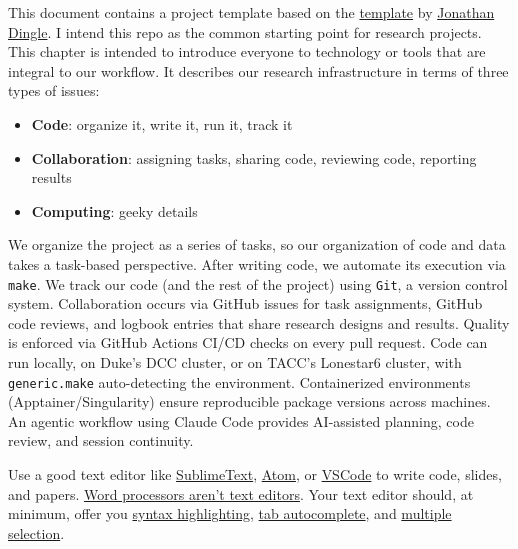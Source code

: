 This document contains a project template based on 
the \href{https://github.com/jrm87/projecttemplate}{template} by \href{http://www.jdingel.com/}{Jonathan Dingle}. 
I intend this repo as the common starting point for research projects. This chapter is intended to introduce everyone to technology or tools that are integral to our workflow.
It describes our research infrastructure in terms of three types of issues:
\begin{itemize}
\item \textbf{Code}: organize it, write it, run it, track it
\item \textbf{Collaboration}: assigning tasks, sharing code, reviewing code, reporting results
\item \textbf{Computing}: geeky details
\end{itemize}

We organize the project as a series of tasks, so our organization of code and data takes a task-based perspective.
After writing code, we automate its execution via \texttt{make}.
We track our code (and the rest of the project) using \texttt{Git}, a version control system.
Collaboration occurs via GitHub issues for task assignments, GitHub code reviews, and logbook entries that share research designs and results.
Quality is enforced via GitHub Actions CI/CD checks on every pull request.
Code can run locally, on Duke's DCC cluster, or on TACC's Lonestar6 cluster,
with \texttt{generic.make} auto-detecting the environment.
Containerized environments (Apptainer/Singularity) ensure reproducible package versions across machines.
An agentic workflow using Claude Code provides AI-assisted planning, code review, and session continuity.

Use a good text editor like
\href{https://www.sublimetext.com/}{SublimeText},
\href{https://atom.io/}{Atom},
or
\href{https://code.visualstudio.com/}{VSCode}
to write code, slides, and papers.
\href{http://plain-text.co/write-and-edit.html}{Word processors aren't text editors}.
Your text editor should, at minimum, offer you
\href{https://en.wikipedia.org/wiki/Syntax_highlighting}{syntax highlighting},
\href{https://en.wikipedia.org/wiki/Command-line_completion}{tab autocomplete},
and \href{https://www.sublimetext.com/}{multiple selection}.

